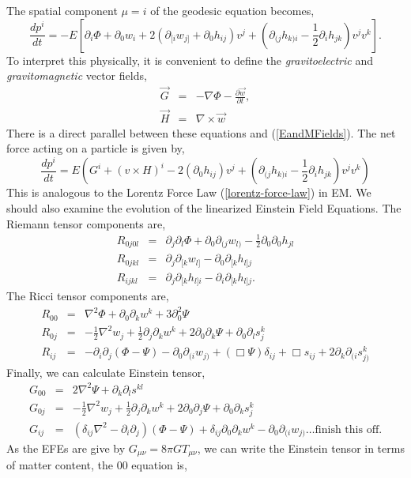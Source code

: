 The spatial component $\mu=i$ of the geodesic equation becomes,
\begin{equation}
    \frac{dp^i}{dt} = -E\left[\partial_i\Phi + \partial_0 w_i + 2\left(\partial_{[i}w_{j]} + \partial_0h_{ij}\right)v^j+ \left(\partial_{(j}h_{k)i} - \frac{1}{2}\partial_{i}h_{jk}\right)v^jv^k\right].
\end{equation}
To interpret this physically, it is convenient to define the \textit{gravitoelectric} and \textit{gravitomagnetic} vector fields,
\begin{eqnarray}
    \vec{G} &=& -\nabla\Phi -\frac{\partial\vec{w}}{\partial t},\\
    \vec{H} &=& \nabla\times \vec{w}
\end{eqnarray}
There is a direct parallel between these equations and (\ref{EandMFields}). The net force acting on a particle is given by,
\begin{equation}
    \frac{dp^i}{d t} =  E\left(G^i + (v\times H)^i - 2(\partial_0h_{ij})v^j+ \left(\partial_{(j}h_{k)i} - \frac{1}{2}\partial_{i}h_{jk}\right)v^jv^k\right)
\end{equation}
This is analogous to the Lorentz Force Law (\ref{lorentz-force-law}) in EM. 
We should also examine the evolution of the linearized Einstein Field Equations. The Riemann tensor components are,
\begin{eqnarray}
    R_{0j0l} &=& \partial_j\partial_l\Phi + \partial_0\partial_{(j}w_{l)} -\frac{1}{2}\partial_0\partial_0h_{jl}\\
    R_{0jkl} &=& \partial_{j}\partial_{[k}w_{l]} - \partial_0\partial_{[k}h_{l]j}\\
    R_{ijkl} &=& \partial_j\partial_{[k}h_{l]i} - \partial_i\partial_{[k}h_{l]j}.
\end{eqnarray}
The Ricci tensor components are,
\begin{eqnarray}
    R_{00} &=& \nabla^2\Phi + \partial_0\partial_kw^k + 3\partial_0^2\Psi\\
    R_{0j} &=& -\frac{1}{2}\nabla^2w_j + \frac{1}{2}\partial_j\partial_kw^k + 2\partial_{0}\partial_k\Psi + \partial_0\partial_ls_{j}^k\\
    R_{ij} &=& -\partial_i\partial_j(\Phi - \Psi) - \partial_0\partial_{(i}w_{j)} + (\Box\Psi)\delta_{ij} + \Box s_{ij} + 2\partial_{k}\partial_{(i}s_{j)}^k
\end{eqnarray}
Finally, we can calculate Einstein tensor,
\begin{eqnarray}
    G_{00} &=& 2\nabla^2\Psi + \partial_k\partial_ls^{kl}\\
    G_{0j} &=& -\frac{1}{2}\nabla^2w_j + \frac{1}{2}\partial_j\partial_kw^k + 2\partial_0\partial_j\Psi +\partial_0\partial_ks_j^k \\
    G_{ij} &=& (\delta_{ij}\nabla^2 - \partial_i\partial_j)(\Phi - \Psi) + \delta_{ij}\partial_0\partial_kw^k - \partial_0\partial_{(i}w_{j)}\dots\text{finish this off}.
\end{eqnarray}
As the EFEs are give by $G_{\mu\nu} = 8\pi G T_{\mu\nu}$, we can write the Einstein tensor in terms of matter content, the $00$ equation is,

